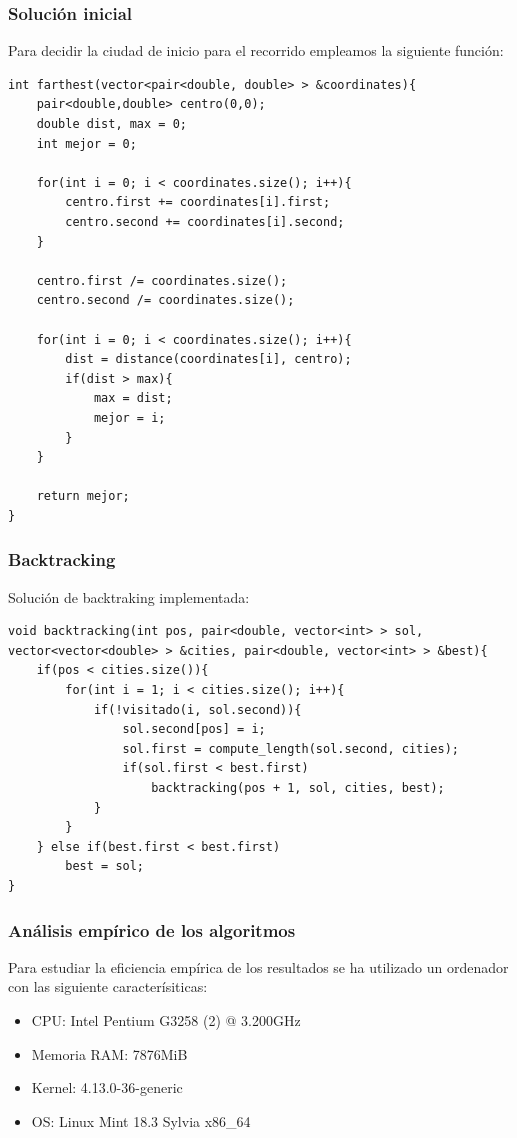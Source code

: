 \documentclass[spanish]{beamer}
\begin{document}
\begin{frame}[fragile]\frametitle{Solución inicial}
	
Para decidir la ciudad de inicio para el recorrido empleamos la siguiente función:

\begin{lstlisting}[basicstyle=\tiny,]
int farthest(vector<pair<double, double> > &coordinates){
	pair<double,double> centro(0,0);
	double dist, max = 0;
	int mejor = 0;
	
	for(int i = 0; i < coordinates.size(); i++){
		centro.first += coordinates[i].first;
		centro.second += coordinates[i].second;
	}
	
	centro.first /= coordinates.size();
	centro.second /= coordinates.size();
	
	for(int i = 0; i < coordinates.size(); i++){
		dist = distance(coordinates[i], centro);
		if(dist > max){
			max = dist;
			mejor = i;
		}
	}
	
	return mejor;
}
\end{lstlisting}
\end{frame}

\begin{frame}[fragile]\frametitle{Backtracking}
Solución de backtraking implementada:
\begin{lstlisting}
void backtracking(int pos, pair<double, vector<int> > sol, vector<vector<double> > &cities, pair<double, vector<int> > &best){
	if(pos < cities.size()){
		for(int i = 1; i < cities.size(); i++){
			if(!visitado(i, sol.second)){
				sol.second[pos] = i;
				sol.first = compute_length(sol.second, cities);
				if(sol.first < best.first)
					backtracking(pos + 1, sol, cities, best);
			}
		}
	} else if(best.first < best.first)
		best = sol;
}

\end{lstlisting}
\end{frame}

\begin{frame}[fragile]\frametitle{Análisis empírico de los algoritmos}

Para estudiar la eficiencia empírica de los resultados se ha utilizado
un ordenador con las siguiente caracterísiticas:

\begin{itemize}
	\item CPU: Intel Pentium G3258 (2) @ 3.200GHz
	\item Memoria RAM: 7876MiB
	\item Kernel: 4.13.0-36-generic
	\item OS: Linux Mint 18.3 Sylvia x86\_64
\end{itemize}
\end{frame}
\end{document}

